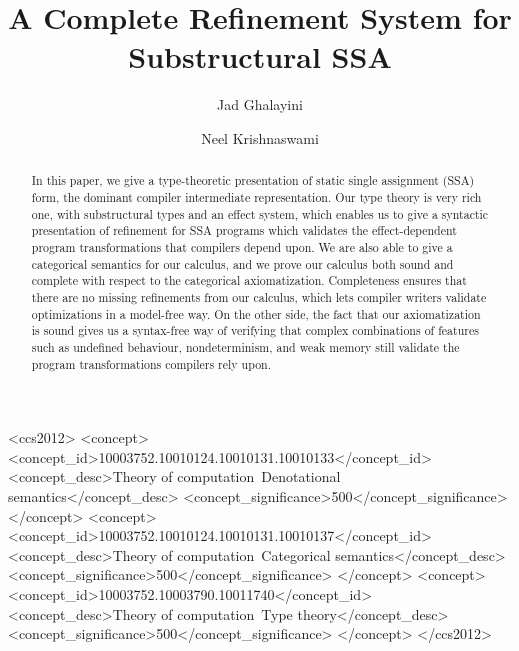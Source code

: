 \documentclass[acmsmall,screen,review]{acmart}
\begin{document}
\title{A Complete Refinement System for Substructural SSA}

\author{Jad Ghalayini}

\author{Neel Krishnaswami}

\begin{abstract}
  In this paper, we give a type-theoretic presentation of static single assignment (SSA) form, the dominant compiler intermediate representation. Our type theory is very rich one, with substructural types and an effect system, which enables us to give a syntactic presentation of refinement for SSA programs which validates the effect-dependent program transformations that compilers depend upon. We are also able to give a categorical semantics for our calculus, and we prove our calculus both sound and complete with respect to the categorical axiomatization. Completeness ensures that there are no missing refinements from our calculus, which lets compiler writers validate optimizations in a model-free way. On the other side, the fact that our axiomatization is sound gives us a syntax-free way of verifying that complex combinations of features such as undefined behaviour, nondeterminism, and weak memory still validate the program transformations compilers rely upon. 
\end{abstract}

\begin{CCSXML}
  <ccs2012>
  <concept>
  <concept_id>10003752.10010124.10010131.10010133</concept_id>
  <concept_desc>Theory of computation~Denotational semantics</concept_desc>
  <concept_significance>500</concept_significance>
  </concept>
  <concept>
  <concept_id>10003752.10010124.10010131.10010137</concept_id>
  <concept_desc>Theory of computation~Categorical semantics</concept_desc>
  <concept_significance>500</concept_significance>
  </concept>
  <concept>
  <concept_id>10003752.10003790.10011740</concept_id>
  <concept_desc>Theory of computation~Type theory</concept_desc>
  <concept_significance>500</concept_significance>
  </concept>
  </ccs2012>
\end{CCSXML}


\end{document}
